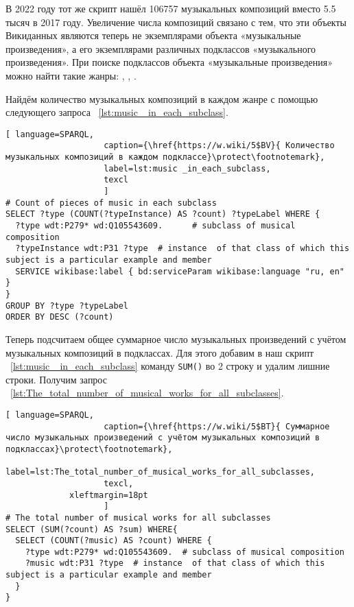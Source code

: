 В 2022 году тот же скрипт нашёл \num{106757} музыкальных композиций вместо \num{5,5} тысяч в 2017 году. Увеличение числа композиций связано с тем, что эти объекты Викиданных являются теперь не экземплярами объекта «музыкальные произведения», а его экземплярами различных подклассов «музыкального произведения». При поиске подклассов объекта «музыкальные произведения» можно найти такие жанры: , , .

Найдём количество музыкальных композиций в каждом жанре с помощью следующего запроса ~\ref{lst:music _in_each_subclass}.

\begin{lstlisting}[ language=SPARQL,
                    caption={\href{https://w.wiki/5$BV}{ Количество музыкальных композиций в каждом подклассе}\protect\footnotemark},
                    label=lst:music _in_each_subclass,
                    texcl
                    ]
# Count of pieces of music in each subclass
SELECT ?type (COUNT(?typeInstance) AS ?count) ?typeLabel WHERE {
  ?type wdt:P279* wd:Q105543609.      # subclass of musical composition
  ?typeInstance wdt:P31 ?type  # instance  of that class of which this subject is a particular example and member
  SERVICE wikibase:label { bd:serviceParam wikibase:language "ru, en" }
}
GROUP BY ?type ?typeLabel
ORDER BY DESC (?count)
\end{lstlisting}%

Теперь подсчитаем общее суммарное число музыкальных произведений с учётом музыкальных композиций в подклассах. Для этого добавим в наш скрипт ~\ref{lst:music _in_each_subclass} команду \lstinline|SUM()| во 2 строку и удалим лишние строки. Получим запрос ~\ref{lst:The_total_number_of_musical_works_for_all_subclasses}.

\begin{lstlisting}[ language=SPARQL,
                    caption={\href{https://w.wiki/5$BT}{ Суммарное число музыкальных произведений с учётом музыкальных композиций в подклассах}\protect\footnotemark},
                    label=lst:The_total_number_of_musical_works_for_all_subclasses,
                    texcl,
	         xleftmargin=18pt
                    ]
# The total number of musical works for all subclasses 
SELECT (SUM(?count) AS ?sum) WHERE{
  SELECT (COUNT(?music) AS ?count) WHERE {
    ?type wdt:P279* wd:Q105543609.  # subclass of musical composition
    ?music wdt:P31 ?type  # instance  of that class of which this subject is a particular example and member
  }
}
\end{lstlisting}%

